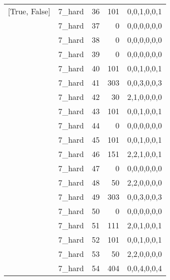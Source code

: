 \begin{tabular}{llrrl}
 [True, False]   & 7\_hard              &            36 &                   101 & 0,0,1,0,0,1   \\
 [True, False]   & 7\_hard              &            37 &                     0 & 0,0,0,0,0,0   \\
 [True, False]   & 7\_hard              &            38 &                     0 & 0,0,0,0,0,0   \\
 [True, False]   & 7\_hard              &            39 &                     0 & 0,0,0,0,0,0   \\
 [True, False]   & 7\_hard              &            40 &                   101 & 0,0,1,0,0,1   \\
 [True, False]   & 7\_hard              &            41 &                   303 & 0,0,3,0,0,3   \\
 [True, False]   & 7\_hard              &            42 &                    30 & 2,1,0,0,0,0   \\
 [True, False]   & 7\_hard              &            43 &                   101 & 0,0,1,0,0,1   \\
 [True, False]   & 7\_hard              &            44 &                     0 & 0,0,0,0,0,0   \\
 [True, False]   & 7\_hard              &            45 &                   101 & 0,0,1,0,0,1   \\
 [True, False]   & 7\_hard              &            46 &                   151 & 2,2,1,0,0,1   \\
 [True, False]   & 7\_hard              &            47 &                     0 & 0,0,0,0,0,0   \\
 [True, False]   & 7\_hard              &            48 &                    50 & 2,2,0,0,0,0   \\
 [True, False]   & 7\_hard              &            49 &                   303 & 0,0,3,0,0,3   \\
 [True, False]   & 7\_hard              &            50 &                     0 & 0,0,0,0,0,0   \\
 [True, False]   & 7\_hard              &            51 &                   111 & 2,0,1,0,0,1   \\
 [True, False]   & 7\_hard              &            52 &                   101 & 0,0,1,0,0,1   \\
 [True, False]   & 7\_hard              &            53 &                    50 & 2,2,0,0,0,0   \\
 [True, False]   & 7\_hard              &            54 &                   404 & 0,0,4,0,0,4   \\

\end{tabular}
